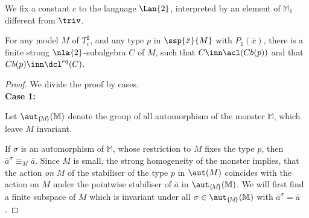 \begin{teo}\label{teowei}
We fix a constant $c$ to the language $\Lan{2}$, interpreted by an element of $\mathbb{M}_{1}$ different from $\triv$.

For any model $M$ of $T^{2}_{c}$, and any type $p$ in $\ssp{\bar x}{M}$ with $P_{1}(\bar x)$,
there is a finite strong $\nla{2}$-subalgebra $C$ of $M$,
such that
$C\inn\acl(Cb(p))$ and that $Cb(p)\inn\dcl^{eq}(C)$.
\end{teo}
\begin{proof}
We divide the proof by cases.\\[+0.7mm]\noindent
{\bf Case 1:}

\medskip
Let $\aut_{\{\!M\!\}}(\mathbb{M})$ denote the group of all automorphism of the monster $\mathbb{M}$,
which leave $M$ invariant.

If $\sigma$ is an automorphism of $\mathbb{M}$, whose restriction to ${M}$ fixes the type $p$,
then $\bar a^{\sigma}\equiv_{M}\bar a$.
%
Since $M$ is small, the strong homogeneity of the monster implies, that
the action {\em on} $M$ of the stabiliser of the type $p$ %
in $\aut(M)$ %
coincides with the action on $M$ %
under the pointwise stabiliser of %
$\bar a$ in $\aut_{\{\!M\!\}}(\mathbb{M})$. %
We will first find a finite subspace of $M$ which is invariant under all $\sigma\in\aut_{\{\!M\!\}}(\mathbb{M})$ with
$\bar a^{\sigma}=\bar a$.


\end{proof}
